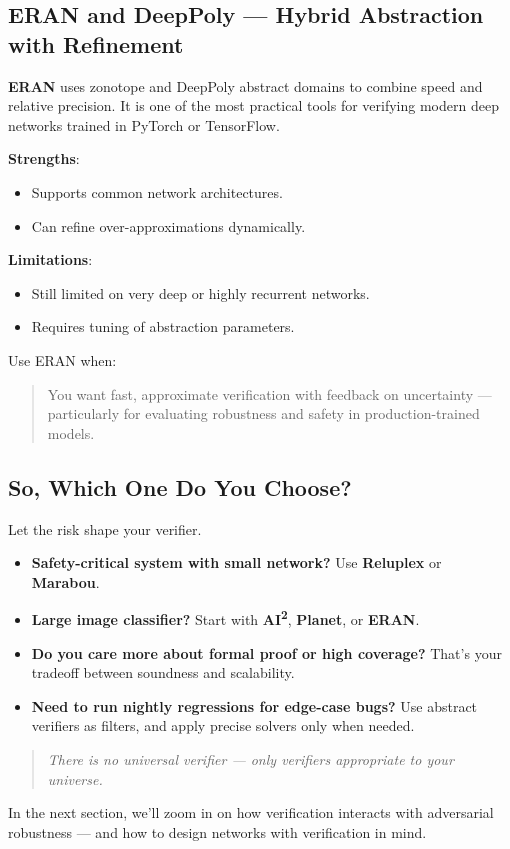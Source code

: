 \subsection{ERAN and DeepPoly — Hybrid Abstraction with Refinement}

\textbf{ERAN} uses zonotope and DeepPoly abstract domains to combine speed and relative precision. It is one of the most practical tools for verifying modern deep networks trained in PyTorch or TensorFlow.

\textbf{Strengths}:
\begin{itemize}
  \item Supports common network architectures.
  \item Can refine over-approximations dynamically.
\end{itemize}

\textbf{Limitations}:
\begin{itemize}
  \item Still limited on very deep or highly recurrent networks.
  \item Requires tuning of abstraction parameters.
\end{itemize}

Use ERAN when:
\begin{quote}
You want fast, approximate verification with feedback on uncertainty — particularly for evaluating robustness and safety in production-trained models.
\end{quote}

\subsection{So, Which One Do You Choose?}

Let the risk shape your verifier.

\begin{itemize}
  \item \textbf{Safety-critical system with small network?} Use \textbf{Reluplex} or \textbf{Marabou}.
  \item \textbf{Large image classifier?} Start with \textbf{AI\textsuperscript{2}}, \textbf{Planet}, or \textbf{ERAN}.
  \item \textbf{Do you care more about formal proof or high coverage?} That’s your tradeoff between soundness and scalability.
  \item \textbf{Need to run nightly regressions for edge-case bugs?} Use abstract verifiers as filters, and apply precise solvers only when needed.
\end{itemize}

\begin{quote}
\textit{There is no universal verifier — only verifiers appropriate to your universe.}
\end{quote}

\vspace{1em}
\noindent
In the next section, we’ll zoom in on how verification interacts with adversarial robustness — and how to design networks with verification in mind.
